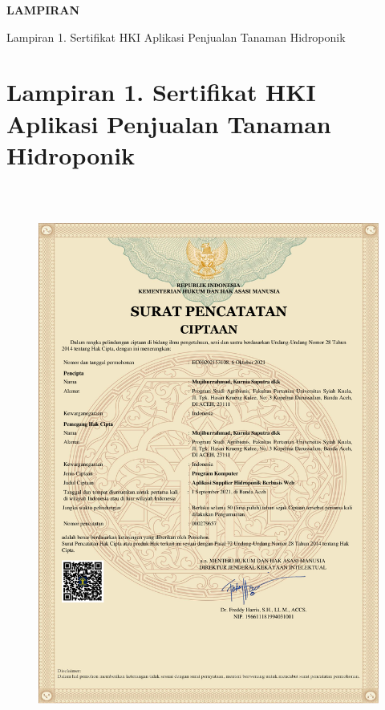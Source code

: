 \fancyhf{} 
\fancyfoot[C]{\thepage}

\begin{center}
    \large{\textbf{LAMPIRAN}}
\end{center}

\begin{appendices}{Lampiran 1. Sertifikat HKI Aplikasi Penjualan Tanaman Hidroponik}
    \section*{Lampiran 1. Sertifikat HKI Aplikasi Penjualan Tanaman Hidroponik}
    \label{lampiran 1}
    \begin{figure}[H]
        \includegraphics[width=13.3cm,height=18.3cm]{gambar/HKI.pdf}
    \end{figure}
\end{appendices}

